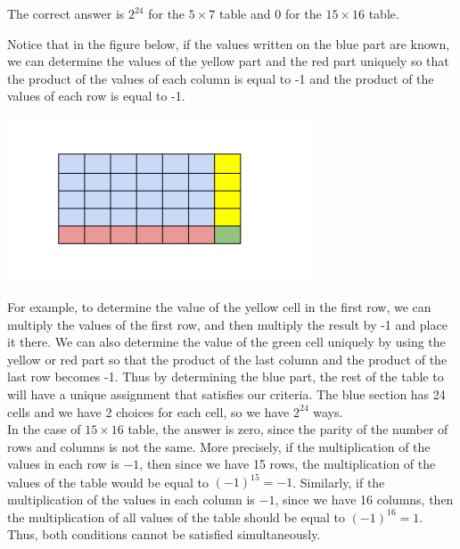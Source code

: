 \begin{solution}
The correct answer is $2^{24}$ for the $5 \times 7$ table and 0 for the $15 \times 16$ table.

Notice that in the figure below, if the values written on the blue part are known, we can determine the values of the yellow part and the red part uniquely so that the product of the values of each column is equal to -1 and the product of the values of each row is equal to -1.

\begin{center}
	\includegraphics[width=9cm]{39/figs/39_diagram0.png}
\end{center}


For example, to determine the value of the yellow cell in the first row, we can multiply the values of the first row, and then multiply the result by -1 and place it there.
We can also determine the value of the green cell uniquely by using the yellow or red part so that the product of the last column and the product of the last row becomes -1. Thus by determining the blue part, the rest of the table to will have a unique assignment that satisfies our criteria. The blue section has 24 cells and we have 2 choices for each cell, so we have $2^{24}$ ways.\\[0.2cm]



In the case of  $15 \times 16$ table, the answer is zero, since the parity of the number of rows and columns is not the same. More precisely, if the multiplication of the values in each row is $-1$, then since we have 15 rows, the multiplication of the values of the table would be equal to $(-1)^{15} = -1$. Similarly, if the multiplication of the values in each column is $-1$, since we have 16 columns, then the multiplication of all values of the table should be equal to $(-1)^{16} = 1$. Thus, both conditions cannot be satisfied simultaneously.


\end{solution}